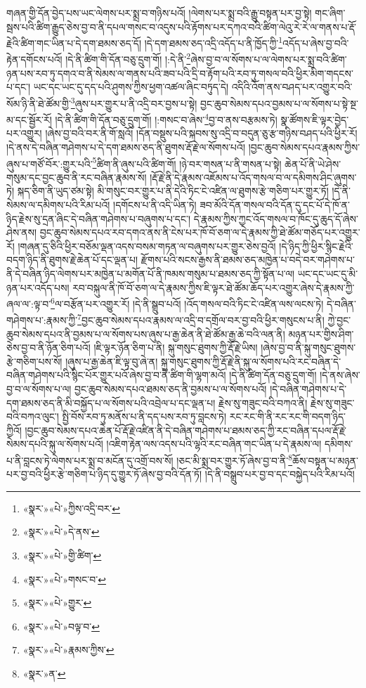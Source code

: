 གཞན་གྱི་དོན་བྱེད་པས་ཡང་ལེགས་པར་སྨྲ་བ་གཉིས་པའོ། །ལེགས་པར་སྨྲ་བའི་རྒྱུ་བསྟན་པར་བྱ་སྟེ། གང་ཞིག་སྦས་པའི་ཚིག་རྒྱུད་ཅེས་བྱ་བ་ནི་དཔལ་གསང་བ་འདུས་པའི་རྟོགས་པར་དཀའ་བའི་ཚིག་ལེའུ་རེ་རེ་ལ་གནས་པ་རྡོ་རྗེའི་ཚིག་གང་ཡིན་པ་དེ་དག་ཐམས་ཅད་དོ། །དེ་དག་ཐམས་ཅད་འདྲི་འདོད་པ་ནི་ཁྱོད་ཀྱི་\footnote{«སྣར་»«པེ་»ཀྱིས་འདྲི་བར་}འདོད་པ་ཞེས་བྱ་བའི་རྟེན་དགོངས་པའོ། །དེ་ནི་ཚིག་གི་དོན་བཅུ་དྲུག་གོ། །:དེ་ནི་\footnote{«སྣར་»«པེ་»དེ་ནས་}ཞེས་བྱ་བ་ལ་སོགས་པ་ལ་ལེགས་པར་སྨྲ་བའི་ཚིག་ཉན་པས་རབ་ཏུ་དགའ་བ་ནི་སེམས་ལ་གནས་པའི་ཟབ་པའི་དྲི་བ་རྟོག་པའི་རབ་ཏུ་གསལ་བའི་ཕྱིར་མིག་གདངས་པ་དང་། ཡང་དང་ཡང་དུ་དད་པའི་ཤུགས་ཀྱིས་ཕྱག་འཚལ་ཞིང་བཏུད་དེ། འདིའི་འོག་ནས་བཤད་པར་འགྱུར་བའི་སོམ་ཉི་ནི་ཐེ་ཚོམ་གྱི་\footnote{«སྣར་»«པེ་»གྱི་ཚིག་}ཞུས་པར་གྱུར་པ་ནི་འདྲི་བར་བྱས་པ་སྟེ། བྱང་ཆུབ་སེམས་དཔའ་བྱམས་པ་ལ་སོགས་པ་སྟེ་སྔ་མ་དང་སྦྱོར་རོ། །དེ་ནི་ཚིག་གི་དོན་བཅུ་དྲུག་གོ། །:གསང་བ་ཞེས་\footnote{«སྣར་»«པེ་»གསང་བ་}བྱ་བ་ནས་བརྩམས་ཏེ། སྣ་ཚོགས་ཇི་ལྟར་བྱེད་པར་འགྱུར། །ཞེས་བྱ་བའི་བར་ནི་གོ་སླའོ། །དོན་བསྡུས་པའི་སྐབས་སུ་འདྲི་བ་བདུན་ཅུ་རྩ་གཉིས་བཤད་པའི་ཕྱིར་རོ། །དེ་ནས་དེ་བཞིན་གཤེགས་པ་དེ་དག་ཐམས་ཅད་ནི་ཐུགས་རྡོ་རྗེ་ལ་སོགས་པའོ། །བྱང་ཆུབ་སེམས་དཔའ་རྣམས་ཀྱིས་ཞུས་པ་གཙོ་བོར་:གྱུར་པའི་\footnote{«སྣར་»«པེ་»གྱུར་}ཚིག་ནི་ཞུས་པའི་ཚིག་གོ། །ཉེ་བར་གསན་པ་ནི་གསན་པ་སྟེ། ཆེན་པོ་ནི་ཡེ་ཤེས་གསུམ་དང་བྱང་ཆུབ་ནི་རང་བཞིན་རྣམས་སོ། །རྡོ་རྗེ་ནི་དེ་རྣམས་འཇོམས་པ་འོད་གསལ་བ་ལ་དམིགས་ཤིང་ཞུགས་ཏེ། སྐད་ཅིག་ནི་ཡུད་ཙམ་སྟེ། མི་གསུང་བར་གྱུར་པ་ནི་དེའི་ཏིང་ངེ་འཛིན་ལ་ཐུགས་རྩེ་གཅིག་པར་གྱུར་ཏོ། །དེ་ནི་སེམས་ལ་དམིགས་པའི་རིམ་པའོ། །དགོངས་པ་ནི་འདི་ཡིན་ཏེ། ཟབ་མོའི་དོན་གསལ་བའི་དོན་དུ་དང་པོ་དེ་ཁོ་ན་ཉིད་རྗེས་སུ་དྲན་ཞིང་དེ་བཞིན་གཤེགས་པ་བཞུགས་པ་དང་། དེ་རྣམས་ཀྱིས་ཀྱང་འོད་གསལ་བ་ཁོང་དུ་ཆུད་དོ་ཞེས་ཤེས་ནས། བྱང་ཆུབ་སེམས་དཔའ་རབ་དགའ་ནས་ནི་ངེས་པར་ཁོ་བོ་ཅག་ལ་དེ་རྣམས་ཀྱི་ཐེ་ཚོམ་གཅོད་པར་འགྱུར་རོ། །གཞན་དུ་ཅིའི་ཕྱིར་བཅོམ་ལྡན་འདས་བསམ་གཏན་ལ་བཞུགས་པར་གྱུར་ཅེས་བྱའོ། །དེ་ཉིད་ཀྱི་ཕྱིར་སྙིང་རྗེའི་བདག་ཉིད་ནི་ཐུགས་རྗེ་ཆེན་པོ་དང་ལྡན་པ། རྫོགས་པའི་སངས་རྒྱས་ནི་ཐམས་ཅད་མཁྱེན་པ་བདེ་བར་གཤེགས་པ་ནི་དེ་བཞིན་ཉིད་ལེགས་པར་མཁྱེན་པ་མགོན་པོ་ནི་ཁམས་གསུམ་པ་ཐམས་ཅད་ཀྱི་སྟོན་པ་ལ། ཡང་དང་ཡང་དུ་མི་ཉན་པར་འདོད་པས། རབ་བསྐུལ་ནི་ཁོ་བོ་ཅག་ལ་དེ་རྣམས་ཀྱིས་ཇི་ལྟར་ཐེ་ཚོམ་ཆོད་པར་འགྱུར་ཞེས་དེ་རྣམས་ཀྱི་ཞལ་ལ་:ལྟ་བ་\footnote{«སྣར་»«པེ་»བལྟ་བ་}ལ་བརྩོན་པར་འགྱུར་རོ། །དེ་ནི་སྒྲུབ་པའོ། །འོད་གསལ་བའི་ཏིང་ངེ་འཛིན་ལས་ལངས་ཏེ། དེ་བཞིན་གཤེགས་པ་:རྣམས་ཀྱི་\footnote{«སྣར་»«པེ་»རྣམས་ཀྱིས་}བྱང་ཆུབ་སེམས་དཔའ་རྣམས་ལ་འདྲི་བ་དགྲོལ་བར་བྱ་བའི་ཕྱིར་གསུངས་པ་ནི། ཀྱེ་བྱང་ཆུབ་སེམས་དཔའ་ནི་བྱམས་པ་ལ་སོགས་པས་ཞུས་པ་རྒྱ་ཆེན་ནི་ཐེ་ཚོམ་རྒྱ་ཆེ་བའི་ལན་ནི། མཉན་པར་གྱིས་ཤིག་ཅེས་བྱ་བ་ནི་ཉོན་ཅིག་པའོ། །ཇི་ལྟར་ཉོན་ཅིག་པ་ནི། སྐུ་གསུང་ཐུགས་ཀྱི་རྡོ་རྗེ་ཡིས། །ཞེས་བྱ་བ་ནི་སྐུ་གསུང་ཐུགས་རྩེ་གཅིག་པས་སོ། །ཞུས་པ་རྒྱ་ཆེན་ཇི་ལྟ་བུ་ཞེ་ན། སྐུ་གསུང་ཐུགས་ཀྱི་རྡོ་རྗེ་ནི་སྐུ་ལ་སོགས་པའི་རང་བཞིན་དེ་བཞིན་གཤེགས་པའི་སྙིང་པོར་གྱུར་པའོ་ཞེས་བྱ་བ་ནི་ཚིག་གི་ལྷག་མའོ། །དེ་ནི་ཚིག་དོན་བཅུ་དྲུག་གོ། །དེ་ནས་ཞེས་བྱ་བ་ལ་སོགས་པ་ལ། བྱང་ཆུབ་སེམས་དཔའ་ཐམས་ཅད་ནི་བྱམས་པ་ལ་སོགས་པའོ། །དེ་བཞིན་གཤེགས་པ་དེ་དག་ཐམས་ཅད་ནི་མི་བསྐྱོད་པ་ལ་སོགས་པའི་འབྲེལ་པ་དང་ལྡན་པ། རྗེས་སུ་གཟུང་བའི་བཀའ་ནི། རྗེས་སུ་གཟུང་བའི་བཀའ་ལུང་། སྤྱི་བོས་རབ་ཏུ་མནོས་པ་ནི་དད་པས་རབ་ཏུ་བླངས་ཏེ། རང་རང་གི་ནི་རང་རང་གི་བདག་ཉིད་ཀྱིའོ། །བྱང་ཆུབ་སེམས་དཔའ་ཆེན་པོ་རྡོ་རྗེ་འཛིན་ནི་དེ་བཞིན་གཤེགས་པ་ཐམས་ཅད་ཀྱི་རང་བཞིན་དཔལ་རྡོ་རྗེ་སེམས་དཔའི་སྐུ་ལ་སོགས་པའོ། །འཇིག་རྟེན་ལས་འདས་པའི་ལྷའི་རང་བཞིན་གང་ཡིན་པ་དེ་རྣམས་ལ། དམིགས་པ་ནི་བླངས་ཏེ་ལེགས་པར་སྨྲ་བ་མངོན་དུ་འགྲོ་བས་སོ། །ཅང་མི་སྨྲ་བར་གྱུར་ཏོ་ཞེས་བྱ་བ་ནི་\footnote{«སྣར་»ན་}ཆོས་བསྟན་པ་མཉན་པར་བྱ་བའི་ཕྱིར་རྩེ་གཅིག་པ་ཉིད་དུ་གྱུར་ཏོ་ཞེས་བྱ་བའི་དོན་ཏོ། །དེ་ནི་བསྒྲུབ་པར་བྱ་བ་དང་བསྐྱེད་པའི་རིམ་པའོ། 